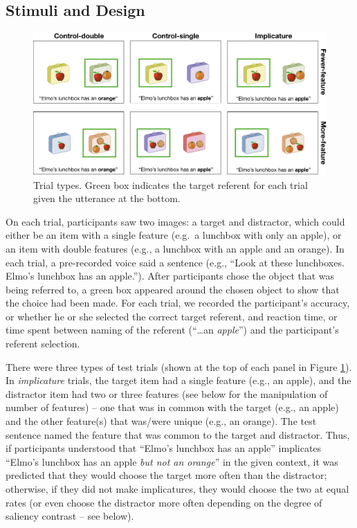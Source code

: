 \documentclass[man]{apa6}
\begin{document}
\subsection{Stimuli and Design}\label{stimuli-and-design}

\begin{figure}
\includegraphics[width=5.98in]{figs/stimuli} \caption{Trial types. Green box indicates the target referent for each trial given the utterance at the bottom.}\label{fig:stimuli}
\end{figure}

On each trial, participants saw two images: a target and distractor,
which could either be an item with a single feature (e.g.~a lunchbox
with only an apple), or an item with double features (e.g., a lunchbox
with an apple and an orange). In each trial, a pre-recorded voice said a
sentence (e.g., \enquote{Look at these lunchboxes. Elmo's lunchbox has
an apple.}). After participants chose the object that was being referred
to, a green box appeared around the chosen object to show that the
choice had been made. For each trial, we recorded the participant's
accuracy, or whether he or she selected the correct target referent, and
reaction time, or time spent between naming of the referent
(\enquote{\ldots{}an \emph{apple}}) and the participant's referent
selection.

There were three types of test trials (shown at the top of each panel in
Figure \ref{fig:stimuli}). In \emph{implicature} trials, the target item
had a single feature (e.g., an apple), and the distractor item had two
or three features (see below for the manipulation of number of features)
-- one that was in common with the target (e.g., an apple) and the other
feature(s) that was/were unique (e.g., an orange). The test sentence
named the feature that was common to the target and distractor. Thus, if
participants understood that \enquote{Elmo's lunchbox has an apple}
implicates \enquote{Elmo's lunchbox has an apple \emph{but not an
orange}} in the given context, it was predicted that they would choose
the target more often than the distractor; otherwise, if they did not
make implicatures, they would choose the two at equal rates (or even
choose the distractor more often depending on the degree of saliency
contrast -- see below).
\end{document}
